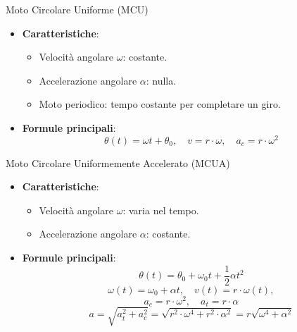 \documentclass{beamer}
\begin{document}
\begin{frame}{Moto Circolare Uniforme (MCU)}
    \begin{itemize}
        \item \textbf{Caratteristiche}:
        \begin{itemize}
            \item Velocità angolare \(\omega\): costante.
            \item Accelerazione angolare \(\alpha\): nulla.
            \item Moto periodico: tempo costante per completare un giro.
        \end{itemize}
        \item \textbf{Formule principali}:
        \[ \theta(t) = \omega t + \theta_0, \quad v = r \cdot \omega, \quad a_c = r \cdot \omega^2 \]
    \end{itemize}
\end{frame}

\begin{frame}{Moto Circolare Uniformemente Accelerato (MCUA)}
    \begin{itemize}
        \item \textbf{Caratteristiche}:
        \begin{itemize}
            \item Velocità angolare \(\omega\): varia nel tempo.
            \item Accelerazione angolare \(\alpha\): costante.
        \end{itemize}
        \item \textbf{Formule principali}:
        \[ \theta(t) = \theta_0 + \omega_0 t + \frac{1}{2}\alpha t^2 \]
        \[ \omega(t) = \omega_0 + \alpha t, \quad v(t) = r \cdot \omega(t),\]
        \[a_c = r \cdot \omega^2, \quad a_t = r \cdot \alpha\]
        $$ a = \sqrt{a_t^2 + a_c^2} = \sqrt{r^2 \cdot \omega^4 + r^2 \cdot \alpha^2 } = r \sqrt{  \omega^4 +\alpha^2 }  $$
    \end{itemize}
\end{frame}
\end{document}
